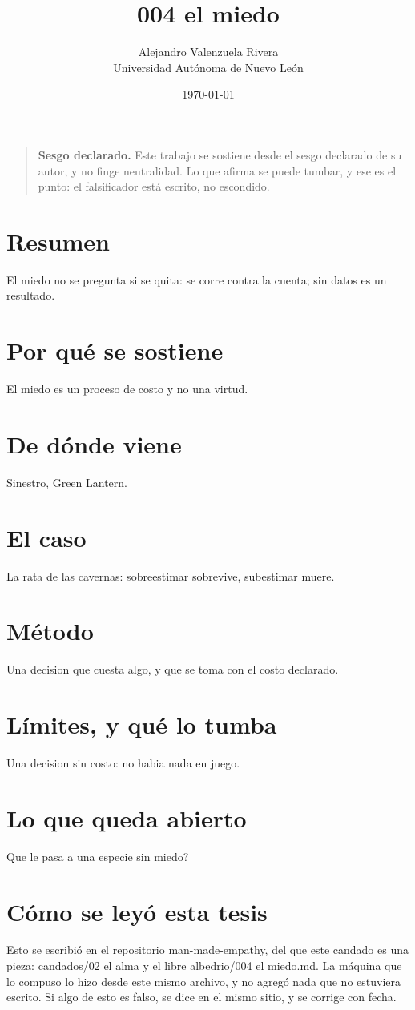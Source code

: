 \documentclass[11pt,a4paper]{article}
\title{004 el miedo}
\author{Alejandro Valenzuela Rivera\\\small Universidad Autónoma de Nuevo León}
\date{\today}
\begin{document}
\maketitle

\begin{quote}
\textbf{Sesgo declarado.} Este trabajo se sostiene desde el sesgo declarado de su autor, y no finge neutralidad. Lo que afirma se puede tumbar, y ese es el punto: el falsificador está escrito, no escondido.
\end{quote}

\section*{Resumen}
El miedo no se pregunta si se quita: se corre contra la cuenta; sin datos es un resultado.

\section{Por qué se sostiene}
El miedo es un proceso de costo y no una virtud.

\section{De dónde viene}
Sinestro, Green Lantern.

\section{El caso}
La rata de las cavernas: sobreestimar sobrevive, subestimar muere.

\section{Método}
Una decision que cuesta algo, y que se toma con el costo declarado.

\section{Límites, y qué lo tumba}
Una decision sin costo: no habia nada en juego.

\section{Lo que queda abierto}
\textquestiondown{}Que le pasa a una especie sin miedo?

\section*{Cómo se leyó esta tesis}
Esto se escribió en el repositorio man-made-empathy, del que este candado es una pieza: candados/02 el alma y el libre albedrio/004 el miedo.md. La máquina que lo compuso lo hizo desde este mismo archivo, y no agregó nada que no estuviera escrito. Si algo de esto es falso, se dice en el mismo sitio, y se corrige con fecha.
\end{document}
